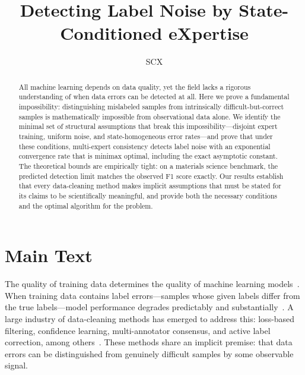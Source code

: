 %

\title{Detecting Label Noise by State-Conditioned eXpertise}

\author{SCX}



\maketitle

\begin{abstract}
All machine learning depends on data quality, yet the field lacks a rigorous understanding of when data errors can be detected at all. Here we prove a fundamental impossibility: distinguishing mislabeled samples from intrinsically difficult-but-correct samples is mathematically impossible from observational data alone. We identify the minimal set of structural assumptions that break this impossibility---disjoint expert training, uniform noise, and state-homogeneous error rates---and prove that under these conditions, multi-expert consistency detects label noise with an exponential convergence rate that is minimax optimal, including the exact asymptotic constant. The theoretical bounds are empirically tight: on a materials science benchmark, the predicted detection limit matches the observed F1 score exactly. Our results establish that every data-cleaning method makes implicit assumptions that must be stated for its claims to be scientifically meaningful, and provide both the necessary conditions and the optimal algorithm for the problem.
\end{abstract}

\section{Main Text}

The quality of training data determines the quality of machine learning models~\cite{placeholder}. When training data contains label errors---samples whose given labels differ from the true labels---model performance degrades predictably and substantially~\cite{placeholder}. A large industry of data-cleaning methods has emerged to address this: loss-based filtering, confidence learning, multi-annotator consensus, and active label correction, among others~\cite{placeholder}. These methods share an implicit premise: that data errors can be distinguished from genuinely difficult samples by some observable signal.

